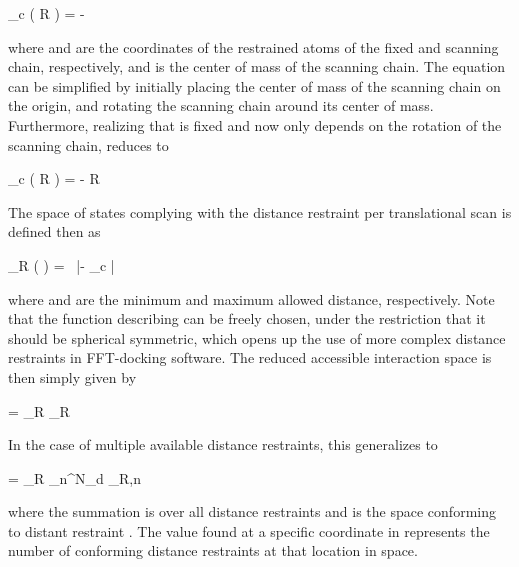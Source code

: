 \startformula
\rvec_c \left( R \right) = \rvecF - 
\stopformula

where \m{\rvecF} and \m{\rvecS} are the coordinates of the restrained atoms of
the fixed and scanning chain, respectively, and \m{\rveccomS} is the center of
mass of the scanning chain. The equation can be simplified by initially placing
the center of mass of the scanning chain on the origin, and rotating the
scanning chain around its center of mass. Furthermore, realizing that
\m{\rvecF} is fixed and \m{\rvecS} now only depends on the rotation of the
scanning chain,  reduces to

\startformula
\rvec_c \left( R \right) = \rvecF - R \rvecS
\stopformula

The space of states complying with the distance restraint per translational
scan  is defined then as

\startformula
\boldL_R \left( \rvec \right) = \startmathcases
{} \MC {}\ \dmin \leq |\rvec - \rvec_c | \leq \dmax \NR
\NC \NC \NR
{} \MC {} \NR
\stopmathcases
\stopformula

where \m{\dmin} and \m{\dmax} are the minimum and maximum allowed distance,
respectively.  Note that the function describing  can be freely
chosen, under the restriction that it should be spherical symmetric, which
opens up the use of more complex distance restraints in FFT-docking software.
The reduced accessible interaction space \m{\redais} is then simply given by

\startformula
\redais = \boldA_R \times \boldL_R
\stopformula

In the case of multiple available distance restraints, this generalizes to

\startformula
\redais = \boldA_R \times \sum_n^{N_d} \boldL_{R,n}
\stopformula

where the summation is over all distance restraints  and
 is the space conforming to distant restraint . The value
found at a specific coordinate in \m{\redais} represents the number of
conforming distance restraints at that location in space. 



